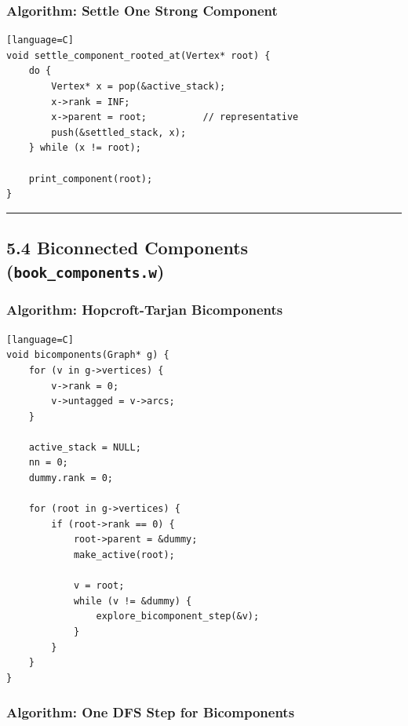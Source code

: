 \documentclass[11pt]{article}
\begin{document}
\subsubsection{Algorithm: Settle One Strong Component}\label{algorithm-settle-one-strong-component}

\begin{verbatim}[language=C]
void settle_component_rooted_at(Vertex* root) {
    do {
        Vertex* x = pop(&active_stack);
        x->rank = INF;
        x->parent = root;          // representative
        push(&settled_stack, x);
    } while (x != root);

    print_component(root);
}
\end{verbatim}

\begin{center}\rule{0.5\linewidth}{0.5pt}\end{center}

\subsection{\texorpdfstring{5.4 Biconnected Components (\texttt{book\_components.w})}{5.4 Biconnected Components (book\_components.w)}}\label{biconnected-components-book_components.w}

\subsubsection{Algorithm: Hopcroft-Tarjan Bicomponents}\label{algorithm-hopcroft-tarjan-bicomponents}

\begin{verbatim}[language=C]
void bicomponents(Graph* g) {
    for (v in g->vertices) {
        v->rank = 0;
        v->untagged = v->arcs;
    }

    active_stack = NULL;
    nn = 0;
    dummy.rank = 0;

    for (root in g->vertices) {
        if (root->rank == 0) {
            root->parent = &dummy;
            make_active(root);

            v = root;
            while (v != &dummy) {
                explore_bicomponent_step(&v);
            }
        }
    }
}
\end{verbatim}

\subsubsection{Algorithm: One DFS Step for Bicomponents}\label{algorithm-one-dfs-step-for-bicomponents}
\end{document}
